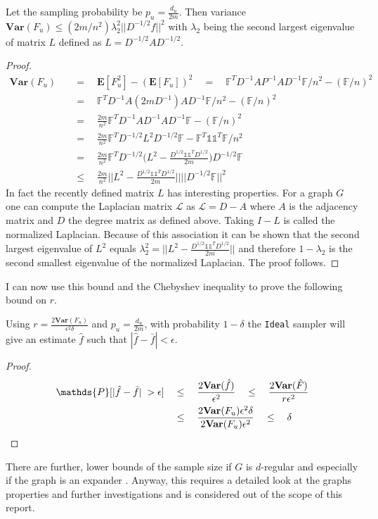 \begin{lemma}
  Let the sampling probability be $p_u = \frac{d_u}{2m}$. Then variance $\textbf{Var}(F_u) \leq (2m/n^2)\lambda_2^2||D^{-1/2}f||^2$ with $\lambda_2$ being the second largest eigenvalue of matrix $L$ defined as $L = D^{-1/2}AD^{-1/2}$. 
\end{lemma}
\begin{proof}
\begin{align*}
\textbf{Var}(F_u) \quad&=\quad \textbf{E}[F_u^2] - (\textbf{E}[F_u])^2 \quad=\quad \mathds{F}^TD^{-1}AP^{-1}AD^{-1}\mathds{F}/n^2 - (\mathds{F}/n)^2 \\
&=\quad \mathds{F}^TD^{-1}A(2mD^{-1})AD^{-1}\mathds{F}/n^2 - (\mathds{F}/n)^2\\
&=\quad \frac{2m}{n^2}\mathds{F}^TD^{-1}AD^{-1}AD^{-1}\mathds{F} - (\mathds{F}/n)^2\\
&=\quad \frac{2m}{n^2}\mathds{F}^TD^{-1/2}L^2D^{-1/2}\mathds{F}-\mathds{F}^T\mathds{1}\mathds{1}^T\mathds{F}/n^2\\
&=\quad \frac{2m}{n^2}\mathds{F}^TD^{-1/2}\bigg(L^2-\frac{D^{1/2}\mathds{1}\mathds{1}^TD^{1/2}}{2m}\bigg)D^{-1/2}\mathds{F}\\
&\leq\quad \frac{2m}{n^2}\bigg|\bigg|L^2 - \frac{D^{1/2}\mathds{1}\mathds{1}^TD^{1/2}}{2m}\bigg|\bigg|||D^{-1/2}\mathds{F}||^2
\end{align*}
In fact the recently defined matrix $L$ has interesting properties. For a graph $G$ one can compute the Laplacian matrix $\mathcal{L}$ as $\mathcal{L} = D - A$ where $A$ is the adjacency matrix and $D$ the degree matrix as defined above.
Taking $I-L$ is called the normalized Laplacian. Because of this association it can be shown that the second largest eigenvalue of $L^2$ equals $\lambda_2^2 = ||L^2 - \frac{D^{1/2}\mathds{1}\mathds{1}^TD^{1/2}}{2m}||$ and therefore $1-\lambda_2$ is the second smallest eigenvalue of the normalized Laplacian. The proof follows.
\end{proof}

I can now use this bound and the Chebyshev inequality to prove the following bound on $r$.
\begin{theorem}
Using $r = \frac{2\textbf{Var}(F_u)}{\epsilon^2\delta}$ and $p_u = \frac{d_u}{2m}$, with probability $1-\delta$ the \texttt{Ideal} sampler will give an estimate $\hat{f}$ such that $|\hat{f}-\bar{f}|< \epsilon$.  
\end{theorem}
\begin{proof}
\begin{align*}
\mathds{P}[|\hat{f}-\bar{f}|\;>\epsilon] \quad&\leq\quad \frac{2\textbf{Var}(\hat{f})}{\epsilon^2} \quad\leq\quad \frac{2\textbf{Var}(\hat{F})}{r\epsilon^2} \\
&\leq\quad \frac{2\textbf{Var}(F_u)\epsilon^2\delta}{2\textbf{Var}(F_u)\epsilon^2} \quad\leq\quad \delta \qedhere
\end{align*}
\end{proof}
There are further, lower bounds of the sample size if $G$ is $d$-regular and especially if the graph is an expander \cite{alon1986eigenvalues}. Anyway, this requires a detailed look at the graphs properties and further investigations and is considered out of the scope of this report.
